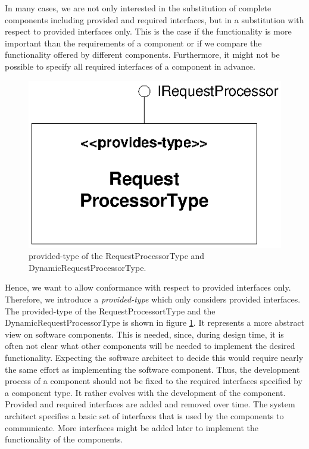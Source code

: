 In many cases, we are not only interested in the substitution of complete
components including provided and required interfaces, but in a substitution
with respect to provided interfaces only. This is the case if the functionality
is more important than the requirements of a component or if we compare the
functionality offered by different components. Furthermore, it might not be
possible to specify all required interfaces of a component in advance. 

\begin{figure}[htbp]
\centering
\includegraphics[scale=0.85]{example/ProvidesType}
\caption{provided-type of the RequestProcessorType and
DynamicRequestProcessorType.}
\label{fig:ProvidesType}
\end{figure}

Hence, we want to allow conformance with respect to provided interfaces only.
Therefore, we introduce a \emph{provided-type} which only considers provided
interfaces. The provided-type of the RequestProcessortType and the
DynamicRequestProcessorType is shown in figure \ref{fig:ProvidesType}. 
It represents a more abstract view on software components. This is needed,
since, during design time, it is often not clear what other components will be
needed to implement the desired functionality. Expecting the software architect
to decide this would require nearly the same effort as implementing the software
component. Thus, the development process of a component should not be fixed to
the required interfaces specified by a component type. It rather evolves with
the development of the component. Provided and required interfaces are added and
removed over time. The system architect specifies a basic set of interfaces that
is used by the components to communicate. More interfaces might be added later
to implement the functionality of the components.

